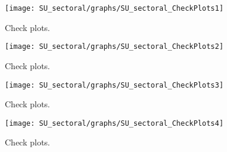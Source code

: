  
\begin{figure}[H]
\centering 
\texttt{[image: SU\_sectoral/graphs/SU\_sectoral\_CheckPlots1]}
\caption{Check plots.}\label{Fig:CheckPlots:1}
\end{figure}
 
\begin{figure}[H]
\centering 
\texttt{[image: SU\_sectoral/graphs/SU\_sectoral\_CheckPlots2]}
\caption{Check plots.}\label{Fig:CheckPlots:2}
\end{figure}
 
\begin{figure}[H]
\centering 
\texttt{[image: SU\_sectoral/graphs/SU\_sectoral\_CheckPlots3]}
\caption{Check plots.}\label{Fig:CheckPlots:3}
\end{figure}
 
\begin{figure}[H]
\centering 
\texttt{[image: SU\_sectoral/graphs/SU\_sectoral\_CheckPlots4]}
\caption{Check plots.}\label{Fig:CheckPlots:4}
\end{figure}
 
